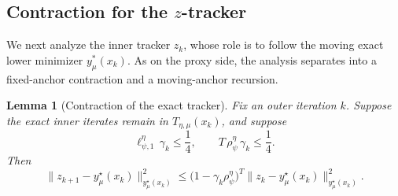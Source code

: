 \documentclass{article}
\newtheorem{lemma}{Lemma}
\begin{document}
\subsection{Contraction for the \(z\)-tracker}

We next analyze the inner tracker \(z_k\), whose role is to follow the moving exact lower
minimizer \(y_{\mu}^*(x_k)\). As on the proxy side, the analysis separates into a fixed-anchor
contraction and a moving-anchor recursion.

\begin{lemma}[Contraction of the exact tracker]
\label{lem:z_fixed_anchor_contraction}
Fix an outer iteration \(k\). Suppose the exact inner iterates remain in
\(T_{\eta,\mu}(x_k)\), and suppose
\begin{equation}
\label{eq:step_exact_contraction}
\ell_{\psi,1}^\eta\,\gamma_k \le \frac{1}{4},
\qquad
T\,\rho_\psi^\eta\,\gamma_k \le \frac{1}{4}.
\end{equation}
Then
\begin{equation}
\label{eq:ztracker_contraction}
\|z_{k+1}-y_\mu^\star(x_k)\|_{y_\mu^\star(x_k)}^2
\le
\bigl(1-\gamma_k\rho_\psi^\eta\bigr)^T
\|z_k-y_\mu^\star(x_k)\|_{y_\mu^\star(x_k)}^2 .
\end{equation}
\end{lemma}
\end{document}
